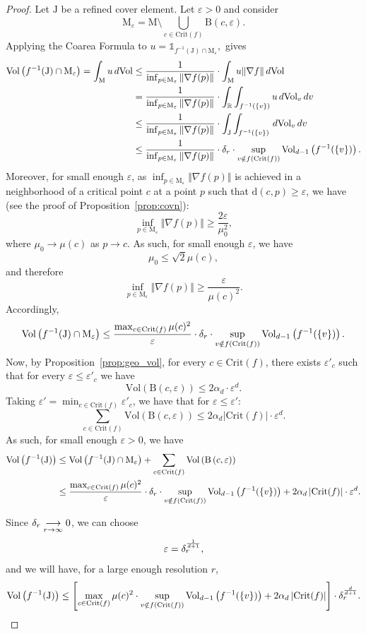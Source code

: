 \documentclass[pdflatex,sn-mathphys-ay]{sn-jnl}%
\newcommand{\man}{\mathrm{M}}
\newcommand{\dis}{\mathrm{d}}
\newcommand{\critic}{{\mathrm {Crit}}}
\newcommand{\ball}{{\mathrm {B}}}
\newcommand{\vol}{\mathrm{Vol}}
\newcommand{\ind}{\mathds{1}}
\newcommand{\coverwidth}{\change{\delta_r}}
\newcommand{\R}{\mathbb{R}}
\newcommand{\eps}{\varepsilon}
\newcommand{\preim}[2]{#1^{-1}(#2)}
\newcommand{\change}[1]{\noindent #1}
\theoremstyle{thmstyleone}%
\begin{document}
\begin{proof}
Let $\mathrm{J}$ be a refined cover element. Let $\eps>0$ and consider $$\man_\eps=\man\setminus \bigcup_{c \in \critic(f)}\ball\left(c,\eps\right).$$
Applying the Coarea Formula to $u=\ind_{\preim{f}{\mathrm{J}}\cap\man_\eps},$ gives
\begin{align*}
\vol\left(\preim{f}{\mathrm{J}}\cap\man_\eps\right)=\int_\man u\,d\vol&\leq\frac{1}{\inf_{p\in\man_\eps}\Vert\nabla f(p)\Vert}\cdot \int_\man u\Vert\nabla f\Vert\,d\vol\\
&=\frac{1}{\inf_{p\in\man_\eps}\Vert\nabla f(p)\Vert}\cdot\int_{\R}\int_{\preim{f}{\{v\}}}u\,d\vol_v\,dv\\
&\leq\frac{1}{\inf_{p\in\man_\eps}\Vert\nabla f(p)\Vert}\cdot\int_{\mathrm{J}}\int_{\preim{f}{\{v\}}}\,d\vol_v\,dv\\
&\leq \frac{1}{\inf_{p\in\man_\eps}\Vert\nabla f(p)\Vert}\cdot\coverwidth\cdot\sup_{v\notin f(\critic(f))}\vol_{d-1}\left(\preim{f}{\{v\}}\right).
\end{align*}
Moreover, for small enough $\eps$, as $\inf_{p\in\man_\eps}\Vert\nabla f(p)\Vert$ is achieved in a neighborhood of a critical point $c$ at a point $p$ such that $\dis(c,p)\geq\eps$, we have (see the proof of Proposition~\ref{prop:covn}):
$$\inf_{p\in\man_\eps}\Vert\nabla f(p)\Vert \geq \frac{2\eps}{\mu_0^2},$$
where $\mu_0\rightarrow\mu(c)$ as $p\rightarrow c$. As such, for small enough $\eps$, we have
$$\mu_0\leq\sqrt{2}\mu(c),$$
and therefore
$$\inf_{p\in\man_\eps}\Vert\nabla f(p)\Vert \geq \frac{\eps}{\mu(c)^2}.$$
Accordingly,
$$\vol\left(\preim{f}{\mathrm{J}}\cap\man_\eps\right)\leq\frac{\max_{c\in\critic(f)}\mu(c)^2}{\eps}\cdot\coverwidth\cdot\sup_{v\notin f(\critic(f))}\vol_{d-1}\left(\preim{f}{\{v\}}\right).$$
Now, by Proposition~\ref{prop:geo_vol}, for every $c\in\critic(f)$, there exists $\eps'_c$ such that for every $\eps\leq\eps'_c$ we have
$$\vol\left(\ball\left(c,\eps\right)\right)\leq 2\alpha_d\cdot\eps^d.$$
Taking $\eps'=\min_{c\in\critic(f)}\eps'_c$, we have that for $\eps\leq\eps'$:
$$\sum_{c\in\critic(f)}\vol\left(\ball\left(c,\eps\right)\right)\leq 2\alpha_d\left|\critic(f)\right|\cdot\eps^d.$$
As such, for small enough $\eps>0$, we have
\begin{align*}
\vol\left(\preim{f}{\mathrm{J}}\right)&\leq\vol\left(\preim{f}{\mathrm{J}}\cap\man_\eps\right)+\sum_{c\in\critic(f)}\vol\left(\ball\left(c,\eps\right)\right)\\
&\leq\frac{\max_{c\in\critic(f)}\mu(c)^2}{\eps}\cdot\coverwidth\cdot\sup_{v\notin f(\critic(f))}\vol_{d-1}\left(\preim{f}{\{v\}}\right)+2\alpha_d\left|\critic(f)\right|\cdot\eps^d.
\end{align*}

Since $\coverwidth\underset{r\rightarrow\infty}{\longrightarrow}0$, we can choose $$\eps=\coverwidth^{\frac{1}{d+1}},$$
and we will have, for a large enough resolution $r$,
$$\vol\left(\preim{f}{\mathrm{J}}\right)\leq\left[\max_{c\in\critic(f)}\mu(c)^2\cdot\sup_{v\notin f(\critic(f))}\vol_{d-1}\left(\preim{f}{\{v\}}\right)+2\alpha_d\left|\critic(f)\right|\right]\cdot\coverwidth^{\frac{d}{d+1}}.$$
\end{proof}
\end{document}
